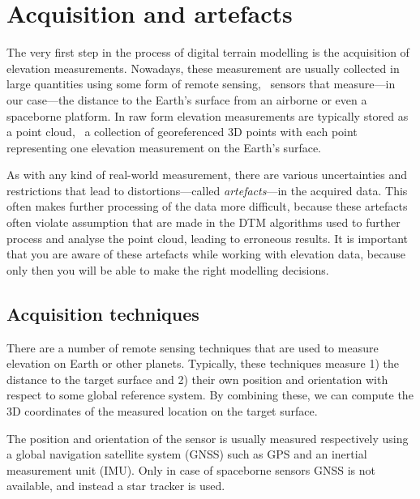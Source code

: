 
\graphicspath{{acquisition/}}

\chapter{Acquisition and artefacts}

%
The very first step in the process of digital terrain modelling is the acquisition of elevation measurements. 
Nowadays, these measurement are usually collected in large quantities using some form of remote sensing, \ie\ sensors that measure---in our case---the distance to the Earth's surface from an airborne or even a spaceborne platform. 
In raw form elevation measurements are typically stored as a point cloud, \ie\ a collection of georeferenced 3D points with each point representing one elevation measurement on the Earth's surface.

As with any kind of real-world measurement, there are various uncertainties and restrictions that lead to distortions---called \emph{artefacts}---in the acquired data. 
This often makes further processing of the data more difficult, because these artefacts often violate assumption that are made in the DTM algorithms used to further process and analyse the point cloud, leading to erroneous results. 
It is important that you are aware of these artefacts while working with elevation data, because only then you will be able to make the right modelling decisions. 


\section{Acquisition techniques}
\label{sec:techniques}
There are a number of remote sensing techniques that are used to measure elevation on Earth or other planets. 
Typically, these techniques measure 1) the distance to the target surface and 2) their own position and orientation with respect to some global reference system. 
By combining these, we can compute the 3D coordinates of the measured location on the target surface. 

The position and orientation of the sensor is usually measured respectively using a global navigation satellite system (GNSS) such as GPS and an inertial measurement unit (IMU).
Only in case of spaceborne sensors GNSS is not available, and instead a star tracker is used.

